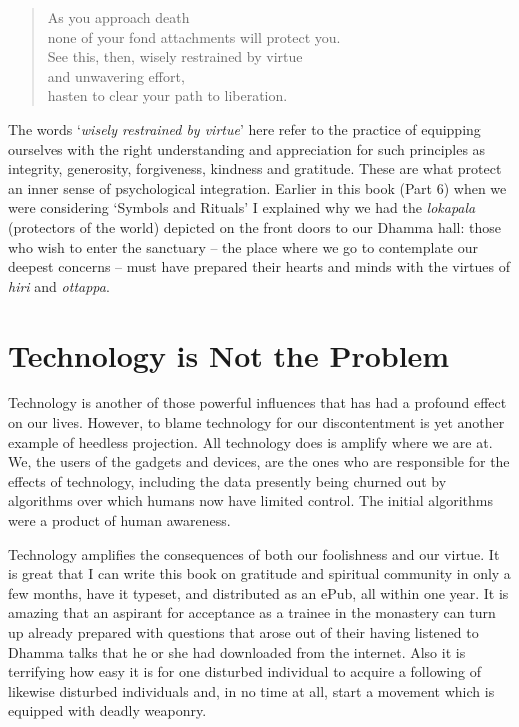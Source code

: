 \begin{quote}
  As you approach death\\
  none of your fond attachments will protect you.\\
  See this, then, wisely restrained by virtue\\
  and unwavering effort,\\
  hasten to clear your path to liberation.
\end{quote}

The words `\emph{wisely restrained by virtue}' here refer to the
practice of equipping ourselves with the right understanding and
appreciation for such principles as integrity, generosity, forgiveness,
kindness and gratitude. These are what protect an inner sense of
psychological integration. Earlier in this book (Part 6) when we were
considering `Symbols and Rituals' I explained why we had the
\emph{lokapala} (protectors of the world) depicted on the front doors to
our Dhamma hall: those who wish to enter the sanctuary -- the place
where we go to contemplate our deepest concerns -- must have prepared
their hearts and minds with the virtues of \emph{hiri} and
\emph{ottappa}.

\section{Technology is Not the Problem}

\enlargethispage{\baselineskip}

Technology is another of those powerful influences that has had a
profound effect on our lives. However, to blame technology for our
discontentment is yet another example of heedless projection. All
technology does is amplify where we are at. We, the users of the gadgets
and devices, are the ones who are responsible for the effects of
technology, including the data presently being churned out by algorithms
over which humans now have limited control. The initial algorithms were
a product of human awareness.

Technology amplifies the consequences of both our foolishness and our
virtue. It is great that I can write this book on gratitude and
spiritual community in only a few months, have it typeset, and
distributed as an ePub, all within one year. It is amazing that an
aspirant for acceptance as a trainee in the monastery can turn up
already prepared with questions that arose out of their having listened
to Dhamma talks that he or she had downloaded from the internet. Also it
is terrifying how easy it is for one disturbed individual to acquire a
following of likewise disturbed individuals and, in no time at all,
start a movement which is equipped with deadly weaponry.

